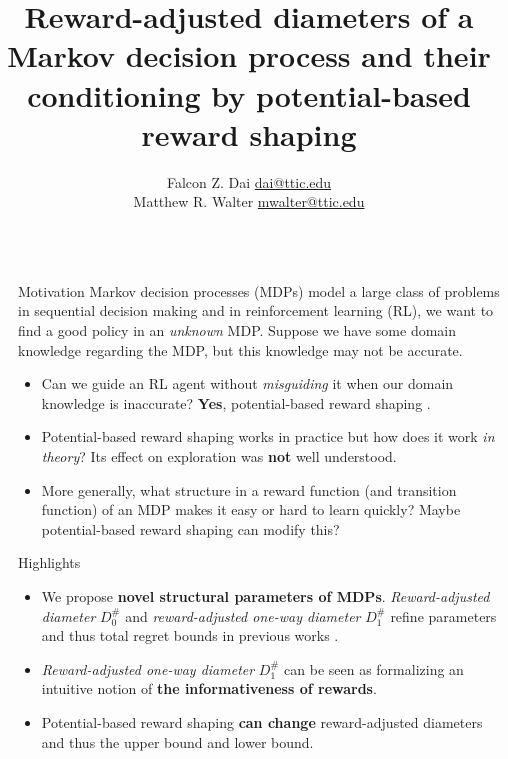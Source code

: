 \documentclass[final]{beamer}
\title{Reward-adjusted diameters of a Markov decision process and their conditioning by potential-based reward shaping}
\author{Falcon Z. Dai \hspace{4.5em} \url{dai@ttic.edu} \\ 
Matthew R. Walter \hspace{2em} \url{mwalter@ttic.edu}}
\institute[TTI-Chicago]{Toyota Technological Institute at Chicago}
\newlength{\sepwidth}
\newlength{\colwidth}
\newcommand{\separatorcolumn}{\begin{column}{\sepwidth}\end{column}}
\begin{document}
\begin{frame}[t]

\begin{columns}[t]
\separatorcolumn

\begin{column}{\colwidth}

  \begin{block}{Motivation}
  Markov decision processes (MDPs) model a large class of problems in sequential decision making and in reinforcement learning (RL), we want to find a good policy in an \textit{unknown} MDP. Suppose we have some domain knowledge regarding the MDP, but this knowledge may not be accurate.
    \begin{itemize}
        \item Can we guide an RL agent without \textit{misguiding} it when our domain knowledge is inaccurate? \textbf{Yes}, potential-based reward shaping \cite{ng1999policy}.
        \item Potential-based reward shaping works in practice but how does it work \textit{in theory}? Its effect on exploration was \textbf{not} well understood.
        \item More generally, what structure in a reward function (and transition function) of an MDP makes it easy or hard to learn quickly? Maybe potential-based reward shaping can modify this? 
    \end{itemize}
  \end{block}

  \begin{alertblock}{Highlights}
    \begin{itemize}
      \item We propose \textbf{novel structural parameters of MDPs}. \textit{Reward-adjusted diameter} $D_0^\#$ and \textit{reward-adjusted one-way diameter} $D_1^\#$ refine parameters and thus total regret bounds in previous works \cite{jaksch2010near,bartlett2009regal}. 
      \item \textit{Reward-adjusted one-way diameter} $D_1^\#$ can be seen as formalizing an intuitive notion of \textbf{the informativeness of rewards}.
      \item Potential-based reward shaping \textbf{can change} reward-adjusted diameters and thus the upper bound and lower bound.
      
    \end{itemize}

  \end{alertblock}


\end{column}
\end{columns}
\end{frame}
\end{document}
